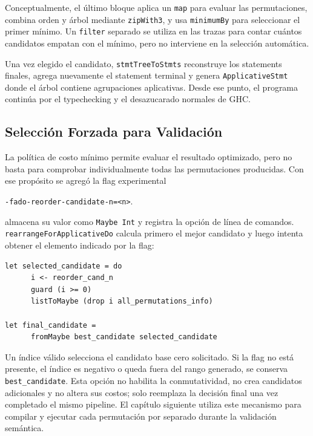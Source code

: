 Conceptualmente, el último bloque aplica un \texttt{map} para evaluar las permutaciones, combina orden y árbol mediante \texttt{zipWith3}, y usa \texttt{minimumBy} para seleccionar el primer mínimo. Un \texttt{filter} separado se utiliza en las trazas para contar cuántos candidatos empatan con el mínimo, pero no interviene en la selección automática.

Una vez elegido el candidato, \texttt{stmtTreeToStmts} reconstruye los statements finales, agrega nuevamente el statement terminal y genera \texttt{ApplicativeStmt} donde el árbol contiene agrupaciones aplicativas. Desde ese punto, el programa continúa por el typechecking y el desazucarado normales de \textsf{GHC}.

\subsection{Selección Forzada para Validación}
\label{sec:solucion-seleccion-forzada}

La política de costo mínimo permite evaluar el resultado optimizado, pero no basta para comprobar individualmente todas las permutaciones producidas. Con ese propósito se agregó la flag experimental

\begin{center}
\texttt{-fado-reorder-candidate-n=<n>}.
\end{center}

 almacena su valor como \texttt{Maybe Int} y  registra la opción de línea de comandos. \texttt{rearrangeForApplicativeDo} calcula primero el mejor candidato y luego intenta obtener el elemento indicado por la flag:

\noindent\begin{minipage}{\textwidth}
\begin{lstlisting}[style=haskell,caption={Selección opcional de un candidato por índice.},label={lst:seleccion-forzada-candidato}]
let selected_candidate = do
      i <- reorder_cand_n
      guard (i >= 0)
      listToMaybe (drop i all_permutations_info)

let final_candidate =
      fromMaybe best_candidate selected_candidate
\end{lstlisting}
\end{minipage}

Un índice válido selecciona el candidato base cero solicitado. Si la flag no está presente, el índice es negativo o queda fuera del rango generado, se conserva \texttt{best\_candidate}. Esta opción no habilita la conmutatividad, no crea candidatos adicionales y no altera sus costos; solo reemplaza la decisión final una vez completado el mismo pipeline. El capítulo siguiente utiliza este mecanismo para compilar y ejecutar cada permutación por separado durante la validación semántica.
